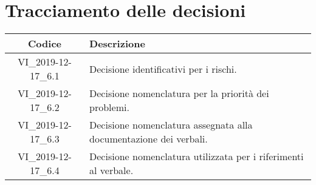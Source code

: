 \section*{Tracciamento delle decisioni}

\begin{center}
	\begin{longtable}{|c|p{12.25cm}|}
	\hline
	\rowcolor{lighter-grayer}
	\textbf{Codice} & \textbf{Descrizione} \\
	\hline
	\endfirsthead
	
	\hline
	VI\_2019-12-17\_6.1 & Decisione identificativi per i rischi. \\
	\hline
	VI\_2019-12-17\_6.2 & Decisione nomenclatura per la priorità dei problemi. \\
	\hline
	VI\_2019-12-17\_6.3 & Decisione nomenclatura assegnata alla documentazione dei verbali. \\
	\hline
	VI\_2019-12-17\_6.4 & Decisione nomenclatura utilizzata per i riferimenti al verbale. \\
	\hline

	\end{longtable}
\end{center}